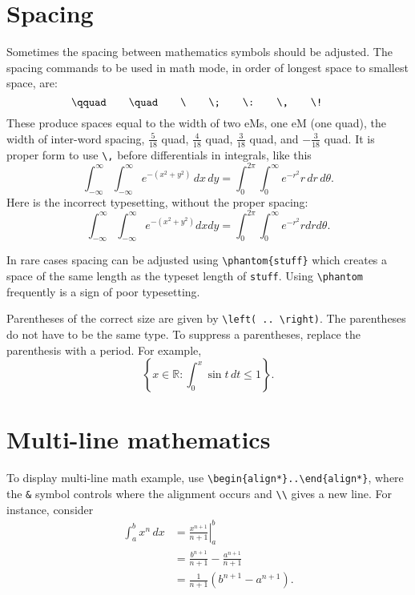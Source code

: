 \documentclass[11pt]{article}
\begin{document}
\section{Spacing}

Sometimes the spacing between mathematics symbols should be adjusted.  The
spacing commands to be used in math mode, in order of longest space to smallest
space, are:
\[
  \verb~\qquad~ \qquad
  \verb~\quad~  \qquad
  \verb~\~      \qquad
  \verb~\;~     \qquad
  \verb~\:~     \qquad
  \verb~\,~     \qquad
  \verb~\!~     \qquad
\]
These produce spaces equal to the width of two eMs, one eM (one quad), the
width of inter-word spacing, \(\frac{5}{18}\) quad, \(\frac{4}{18}\) quad,
\(\frac{3}{18}\) quad, and \(-\frac{3}{18}\) quad.  It is proper form to use
\verb~\,~ before differentials in integrals, like this
\[
  \int_{-\infty}^\infty \int_{-\infty}^\infty e^{-(x^2+y^2)} \, dx \, dy
  = \int_0^{2 \pi} \int_0^\infty e^{-r^2} r \, dr \, d\theta.
\]
Here is the incorrect typesetting, without the proper spacing:
\[
  \int_{-\infty}^\infty \int_{-\infty}^\infty e^{-(x^2+y^2)}  dx  dy
  = \int_0^{2 \pi} \int_0^\infty e^{-r^2} r dr d\theta.
\]

In rare cases spacing can be adjusted using \verb~\phantom{stuff}~ which
creates a space of the same length as the typeset length of \verb~stuff~.
Using \verb~\phantom~ frequently is a sign of poor typesetting.

Parentheses of the correct size are given by \verb~\left( .. \right)~.  The
parentheses do not have to be the same type.  To suppress a parentheses,
replace the parenthesis with a period.  For example,
\[ \left \{ x \in \mathbb{R} : \int_0^x \sin t \, dt \leq 1 \right \}. \]

\section{Multi-line mathematics}

To display multi-line math example, use \verb~\begin{align*}..\end{align*}~,
where the \verb~&~ symbol controls where the alignment occurs and \verb~\\~
gives a new line.  For instance, consider
\begin{align}
  \int_a^b x^n \, dx
 & = \left. \frac{x^{n+1}}{n+1} \right|_a^b   \\
 & = \frac{b^{n+1}}{n+1} -\frac{a^{n+1}}{n+1} \nonumber \\
 & = \frac{1}{n+1}(b^{n+1}-a^{n+1}).
\end{align}
\end{document}
